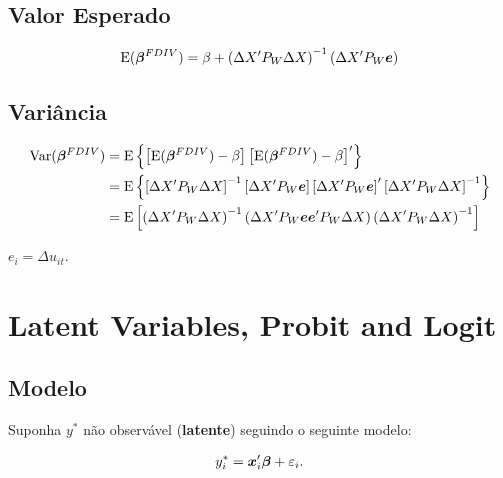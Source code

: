 \documentclass[11pt, oneside, a4paper, article]{article}
\numberwithin{equation}{section}
\begin{document}
\begin{description}
\subsection{Valor Esperado}

\vspace{-1 em}
\begin{align*}
\text{E}( \boldsymbol{\beta}^{FDIV} ) =  
\beta + 
\left( \Delta X' P_{W} \Delta X \right)^{-1}
\left( \Delta X' P_{W} \boldsymbol{e} \right)
\end{align*}

\subsection{Variância}

\vspace{-1 em}
\begin{align*}
\text{Var}( \boldsymbol{\beta}^{FDIV} ) &=
\text{E}\left\{  
\left[ \text{E}( \boldsymbol{\beta}^{FDIV} ) - \beta \right] 
\left[ \text{E}( \boldsymbol{\beta}^{FDIV} ) - \beta \right]'
\right\}
\\
&=
\text{E}\left\{  
\left[ \Delta X' P_{W} \Delta X \right]^{-1}
\left[ \Delta X' P_{W} \boldsymbol{e} \right]
\left[ \Delta X' P_{W} \boldsymbol{e} \right]'
\left[ \Delta X' P_{W} \Delta X \right]^{-1}
\right\}
\\
&=
\text{E}\left[
\left( \Delta X' P_{W} \Delta X \right)^{-1}
\left( \Delta X' P_{W} \boldsymbol{e} \boldsymbol{e}' P_{W} \Delta X \right)
\left( \Delta X' P_{W} \Delta X \right)^{-1}
\right]
\end{align*}

\noindent
$e_{i} = \Delta u_{it}$.

\clearpage
\section{Latent Variables, Probit and Logit}

\subsection{Modelo}

Suponha $y^{*}$ não observável (\textbf{latente}) seguindo o seguinte modelo:

\vspace{-1 em}
\begin{align} \label{mod1:probit}
	y_{i}^{*} = \boldsymbol{x}_{i}' \boldsymbol{\beta} + \varepsilon_{i}.
\end{align}


\end{description}
\end{document}
